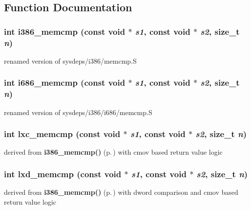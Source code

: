\subsection{Function Documentation}
\subsubsection{\setlength{\rightskip}{0pt plus 5cm}int i386\_\-memcmp (const void $\ast$ {\em s1}, const void $\ast$ {\em s2}, size\_\-t {\em n})}\label{memcmp_2def__test_8h_a6}


renamed version of sysdeps/i386/memcmp.S 
\subsubsection{\setlength{\rightskip}{0pt plus 5cm}int i686\_\-memcmp (const void $\ast$ {\em s1}, const void $\ast$ {\em s2}, size\_\-t {\em n})}\label{memcmp_2def__test_8h_a7}


renamed version of sysdeps/i386/i686/memcmp.S 
\subsubsection{\setlength{\rightskip}{0pt plus 5cm}int lxc\_\-memcmp (const void $\ast$ {\em s1}, const void $\ast$ {\em s2}, size\_\-t {\em n})}\label{memcmp_2def__test_8h_a8}


derived from {\bf i386\_\-memcmp()} {\rm (p.\,\pageref{memcmp_2def__test_8h_a6})} with cmov based return value logic 
\subsubsection{\setlength{\rightskip}{0pt plus 5cm}int lxd\_\-memcmp (const void $\ast$ {\em s1}, const void $\ast$ {\em s2}, size\_\-t {\em n})}\label{memcmp_2def__test_8h_a9}


derived from {\bf i386\_\-memcmp()} {\rm (p.\,\pageref{memcmp_2def__test_8h_a6})} with dword comparison and cmov based return value logic 

